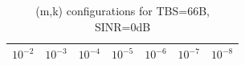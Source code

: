 \begin{table}[ht]
\centering
\caption{(m,k) configurations for TBS=66B, SINR=0dB}
\label{tab:conf_{66B_0dB}}
\begin{tabular}{ccccccc}
\hline
$10^{-2}$ & $10^{-3}$ & $10^{-4}$ & $10^{-5}$ & $10^{-6}$ & $10^{-7}$ & $10^{-8}$ \\ \hline
\hline
\end{tabular}
\end{table}